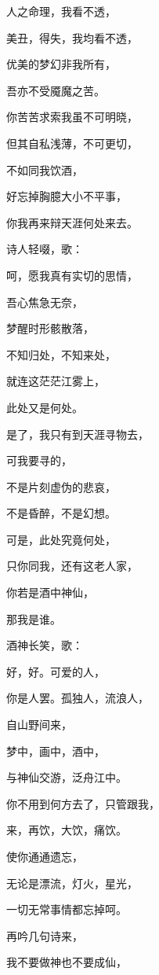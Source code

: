 \documentclass[UTF8]{article}
\begin{document}
\par 人之命理，我看不透，
\par 美丑，得失，我均看不透，
\par 优美的梦幻非我所有，
\par 吾亦不受魇魔之苦。
\par 你苦苦求索我虽不可明晓，
\par 但其自私浅薄，不可更切，
\par 不如同我饮酒，
\par 好忘掉胸臆大小不平事，
\par 你我再来辩天涯何处来去。
\\[0.6cm]
\par 诗人轻啜，歌：
\\[0.6cm]
\par 呵，愿我真有实切的思情，
\par 吾心焦急无奈，
\par 梦醒时形骸散落，
\par 不知归处，不知来处，
\par 就连这茫茫江雾上，
\par 此处又是何处。
\par 是了，我只有到天涯寻物去，
\par 可我要寻的，
\par 不是片刻虚伪的悲哀，
\par 不是昏醉，不是幻想。
\par 可是，此处究竟何处，
\par 只你同我，还有这老人家，
\par 你若是酒中神仙，
\par 那我是谁。
\\[0.6cm]
\par 酒神长笑，歌：
\\[0.6cm]
\par 好，好。可爱的人，
\par 你是人罢。孤独人，流浪人，
\par 自山野间来，
\par 梦中，画中，酒中，
\par 与神仙交游，泛舟江中。
\par 你不用到何方去了，只管跟我，
\par 来，再饮，大饮，痛饮。
\par 使你通通遗忘，
\par 无论是漂流，灯火，星光，
\par 一切无常事情都忘掉呵。
\par 再吟几句诗来，
\par 我不要做神也不要成仙，
\end{document}
